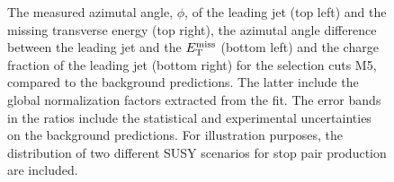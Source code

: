 \begin{figure}[!ht]
\begin{center}
{    }
  \end{center}
  \caption[Kinematic distributions of the azimutal angle, $\phi$, of the leading jet and the missing transverse energy, the azimutal angle difference between the leading jet and the $\met$, and the charge fraction of the leading jet in the signal regions for the selection cuts of region M5, after the normalization factors extracted from the fit have been applied.]
{The measured azimutal angle, $\phi$, of the leading jet (top left) and the missing transverse energy (top right), the azimutal angle difference between the leading jet and the $\met$ (bottom left) and the charge fraction of the leading jet (bottom right) for the selection cuts M5, compared to the background predictions. The latter include the global normalization factors extracted from the fit. The error bands in the ratios include the statistical and experimental uncertainties on the background predictions. For illustration purposes, the distribution of two different SUSY scenarios for stop pair production are included.}
  \label{fig:Plot_M5_SR_Jet1}
\end{figure}

